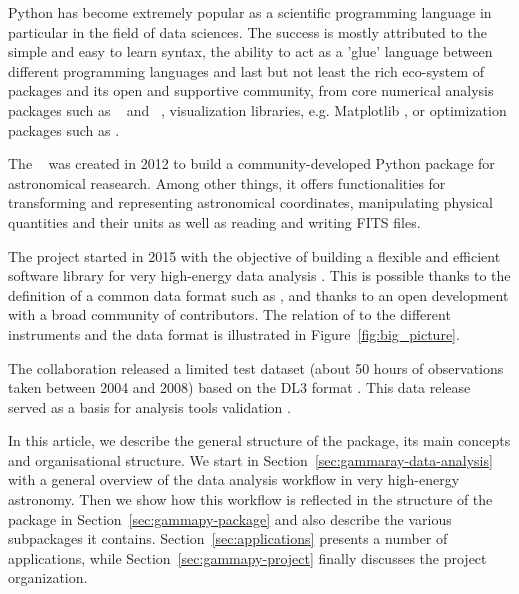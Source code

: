 \documentclass[traditabstract, longauth]{aa}
\begin{document}
Python has become extremely popular as a scientific programming language
in particular in the field of data sciences. The success is
mostly attributed to the simple and easy to learn syntax, the ability to act as
a 'glue' language between different programming languages and last but not least
the rich eco-system of packages and its open and supportive community, from
core numerical analysis packages such as \numpy~\citep{numpy} and
\scipy~\citep{2020SciPy-NMeth}, visualization libraries, e.g. Matplotlib \citep{matplotlib},
or optimization packages such as \iminuit \citep{iminuit}.

The \astropy~\citep{astropy} was created in 2012 to build a community-developed
Python package for astronomical reasearch. Among other things, it offers functionalities for
transforming and representing astronomical coordinates, manipulating physical quantities
and their units as well as reading and writing FITS files.

The \gammapy project started in 2015 with the objective of building a flexible and
efficient software library for very high-energy \gammaray data analysis \citep{gammapy_2015}.
This is possible thanks to the definition of a common data format such as \gadf, and thanks to
an open development with a broad community of contributors. The relation of \gammapy to the
different instruments and the \gadf data format is illustrated in Figure~\ref{fig:big_picture}.


The \hess collaboration released a limited test dataset (about 50 hours of
observations taken between 2004 and 2008) based  on the \gadf DL3 format \citep{HESS_DR1}.
This data release served as a basis for analysis tools validation \cite[see e.g.]{Mohrmann2019}.

In this article, we describe the general structure of the \gammapy package,
its main concepts and organisational structure. We start in
Section~\ref{sec:gammaray-data-analysis} with a general overview
of the data analysis workflow in very high-energy \gammaray astronomy. Then we
show how this workflow is reflected in the structure of the \gammapy package 
in Section~\ref{sec:gammapy-package} and also
describe the various subpackages it contains. Section~\ref{sec:applications}
presents a number of applications, while Section~\ref{sec:gammapy-project}
finally discusses the project organization.
\end{document}
